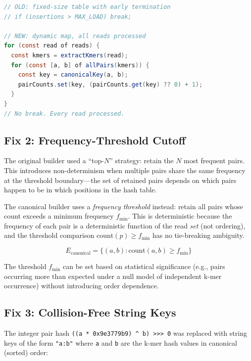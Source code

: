 \documentclass{../yalumba}
\begin{document}
\begin{lstlisting}[language=Java,caption={Canonical builder: no capacity limit.}]
// OLD: fixed-size table with early termination
// if (insertions > MAX_LOAD) break;

// NEW: dynamic map, all reads processed
for (const read of reads) {
  const kmers = extractKmers(read);
  for (const [a, b] of allPairs(kmers)) {
    const key = canonicalKey(a, b);
    pairCounts.set(key, (pairCounts.get(key) ?? 0) + 1);
  }
}
// No break. Every read processed.
\end{lstlisting}

\subsection{Fix 2: Frequency-Threshold Cutoff}
\label{sec:threshold}

The original builder used a ``top-$N$'' strategy: retain the $N$ most frequent
pairs. This introduces non-determinism when multiple pairs share the same
frequency at the threshold boundary---the set of retained pairs depends on
which pairs happen to be in which positions in the hash table.

The canonical builder uses a \textit{frequency threshold} instead: retain all
pairs whose count exceeds a minimum frequency $f_{\min}$. This is deterministic
because the frequency of each pair is a deterministic function of the read
\textit{set} (not ordering), and the threshold comparison $\text{count}(p) \geq
f_{\min}$ has no tie-breaking ambiguity.

\begin{equation}
  E_{\text{canonical}} = \{ (a, b) : \text{count}(a, b) \geq f_{\min} \}
  \label{eq:threshold}
\end{equation}

The threshold $f_{\min}$ can be set based on statistical significance (e.g.,
pairs occurring more than expected under a null model of independent k-mer
occurrence) without introducing order dependence.

\subsection{Fix 3: Collision-Free String Keys}

The integer pair hash \texttt{((a * 0x9e3779b9) \^{} b) >>> 0} was replaced
with string keys of the form \texttt{"a:b"} where \texttt{a} and \texttt{b}
are the k-mer hash values in canonical (sorted) order:
\end{document}

